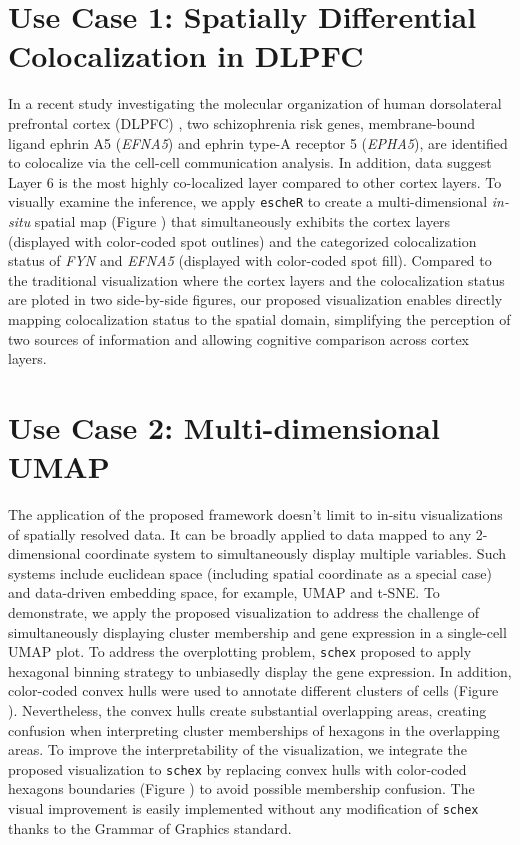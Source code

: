 \documentclass[11pt]{article}
\begin{document}
\section*{Use Case 1: Spatially Differential Colocalization in DLPFC}
In a recent study investigating the molecular organization of human dorsolateral prefrontal cortex (DLPFC) \cite{huukimyers_2023}, two schizophrenia risk genes, membrane-bound ligand ephrin A5 (\textit{EFNA5}) and ephrin type-A receptor 5 (\textit{EPHA5}), are identified to colocalize via the cell-cell communication analysis. In addition, data suggest Layer 6 is the most highly co-localized layer compared to other cortex layers. To visually examine the inference, we apply \texttt{escheR} to create a multi-dimensional \textit{in-situ} spatial map (Figure \label{fig:visual}) that simultaneously exhibits the cortex layers (displayed with color-coded spot outlines) and the categorized colocalization status of \textit{FYN} and \textit{EFNA5} (displayed with color-coded spot fill). Compared to the traditional visualization where the cortex layers and the colocalization status are ploted in two side-by-side figures, our proposed visualization enables directly mapping colocalization status to the spatial domain, simplifying the perception of two sources of information and allowing cognitive comparison across cortex layers. 

\section*{Use Case 2: Multi-dimensional UMAP}
The application of the proposed framework doesn't limit to in-situ visualizations of spatially resolved data. It can be broadly applied to data mapped to any 2-dimensional coordinate system to simultaneously display multiple variables. Such systems include euclidean space (including spatial coordinate as a special case) and data-driven embedding space, for example, UMAP and t-SNE. To demonstrate, we apply the proposed visualization to address the challenge of simultaneously displaying cluster membership and gene expression in a single-cell UMAP plot. To address the overplotting problem, \texttt{schex} proposed to apply hexagonal binning strategy to unbiasedly display the gene expression.\cite{freytag_2020} In addition, color-coded convex hulls were used to annotate different clusters of cells (Figure \label{fig:visual}). Nevertheless, the convex hulls create substantial overlapping areas, creating confusion when interpreting cluster memberships of hexagons in the overlapping areas. To improve the interpretability of the visualization, we integrate the proposed visualization to \texttt{schex} by replacing convex hulls with color-coded hexagons boundaries  (Figure \label{fig:visual}) to avoid possible membership confusion. The visual improvement is easily implemented without any modification of \texttt{schex} thanks to the Grammar of Graphics \cite{wilkinson_2012} standard.
\end{document}
